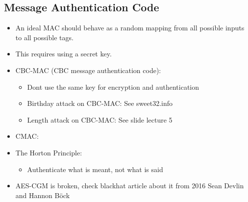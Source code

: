 \subsection{Message Authentication Code}
\begin{itemize}
  \item{An ideal MAC should behave as a random mapping from all possible inputs
      to all possible tags.}
    \item{This requires using a secret key.}
\item{CBC-MAC (CBC message authentication code):
    \begin{itemize}
    \item{Dont use the same key for encryption and authentication}
    \item{Birthday attack on CBC-MAC:
        See sweet32.info
      }
    \item{Length attack on CBC-MAC:
        See slide lecture 5
      }
    \end{itemize}

  }
\item{CMAC:
    

  }
\item{The Horton Principle:
    \begin{itemize}
      \item{Authenticate what is meant, not what is said}
     \end{itemize}
   }
\item{AES-CGM is broken, check blackhat article about it from 2016 Sean Devlin
    and Hannon B\"{o}ck}
\end{itemize}
